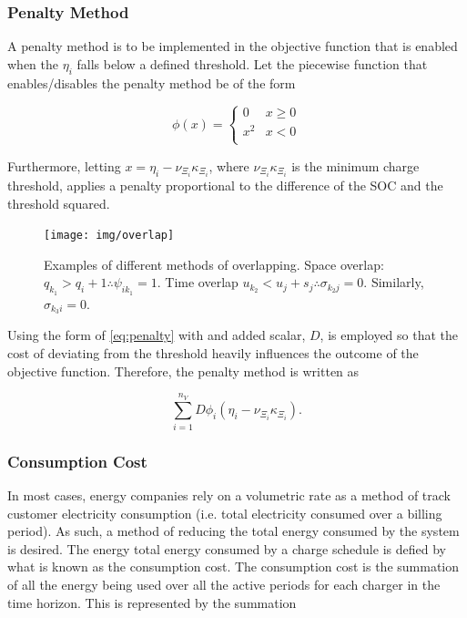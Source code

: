 \documentclass[ee,thesis]{usuthesis}
\begin{document}
\subsubsection{Penalty Method}
\label{sec:penalty-method}
A penalty method is to be implemented in the objective function that is enabled when the \(\eta_i\) falls below a defined
threshold. Let the piecewise function that enables/disables the penalty method be of the form

\begin{equation}
\label{eq:penalty}
  \phi(x) =
  \begin{cases}
    0   & x \ge 0 \\
    x^2 & x < 0\\
  \end{cases}
\end{equation}

Furthermore, letting \(x = \eta_i - \nu_{\Xi_i} \kappa_{\Xi_i}\), where \(\nu_{\Xi_i} \kappa_{\Xi_i}\) is the minimum charge threshold, applies a penalty
proportional to the difference of the SOC and the threshold squared.

\begin{figure}[htpb]
  \centering \texttt{[image: img/overlap]}
  \caption{Examples of different methods of overlapping. Space overlap: $q_{k_1} > q_{i} + 1 \therefore \psi_{ik_{1}} = 1$.
    Time overlap $u_{k_2} < u_{j} + s_j \therefore \sigma_{k_{2}j} = 0$. Similarly, $\sigma_{k_3 i} = 0$.}
  \label{fig:overlap}
\end{figure}

Using the form of \ref{eq:penalty} with and added scalar, \(D\), is employed so that the cost of deviating from the threshold
heavily influences the outcome of the objective function. Therefore, the penalty method is written as

\begin{equation}
\label{eq:penalty-method}
\sum_{i=1}^{n_V} D \phi_i(\eta_i - \nu_{\Xi_i} \kappa_{\Xi_i})\text{.}
\end{equation}

\subsubsection{Consumption Cost}
\label{sec:consumpction-cost}
In most cases, energy companies rely on a volumetric rate as a method of track customer electricity consumption (i.e.
total electricity consumed over a billing period). As such, a method of reducing the total energy consumed by the system
is desired. The energy total energy consumed by a charge schedule is defied by what is known as the consumption cost.
The consumption cost is the summation of all the energy being used over all the active periods for each charger in the
time horizon. This is represented by the summation
\end{document}
